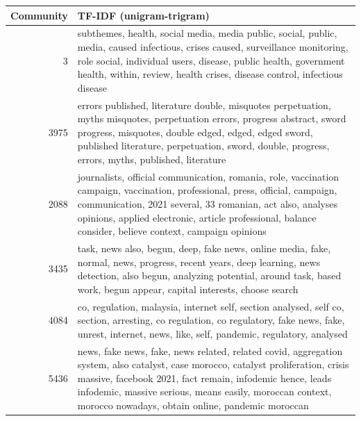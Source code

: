 \begin{tabular}{rl}
\toprule
Community & TF-IDF (unigram-trigram) \\
\midrule
3 & subthemes, health, social media, media public, social, public, media, caused infectious, crises caused, surveillance monitoring, role social, individual users, disease, public health, government health, within, review, health crises, disease control, infectious disease \\
3975 & errors published, literature double, misquotes perpetuation, myths misquotes, perpetuation errors, progress abstract, sword progress, misquotes, double edged, edged, edged sword, published literature, perpetuation, sword, double, progress, errors, myths, published, literature \\
2088 & journalists, official communication, romania, role, vaccination campaign, vaccination, professional, press, official, campaign, communication, 2021 several, 33 romanian, act also, analyses opinions, applied electronic, article professional, balance consider, believe context, campaign opinions \\
3435 & task, news also, begun, deep, fake news, online media, fake, normal, news, progress, recent years, deep learning, news detection, also begun, analyzing potential, around task, based work, begun appear, capital interests, choose search \\
4084 & co, regulation, malaysia, internet self, section analysed, self co, section, arresting, co regulation, co regulatory, fake news, fake, unrest, internet, news, like, self, pandemic, regulatory, analysed \\
5436 & news, fake news, fake, news related, related covid, aggregation system, also catalyst, case morocco, catalyst proliferation, crisis massive, facebook 2021, fact remain, infodemic hence, leads infodemic, massive serious, means easily, moroccan context, morocco nowadays, obtain online, pandemic moroccan \\
\bottomrule
\end{tabular}
